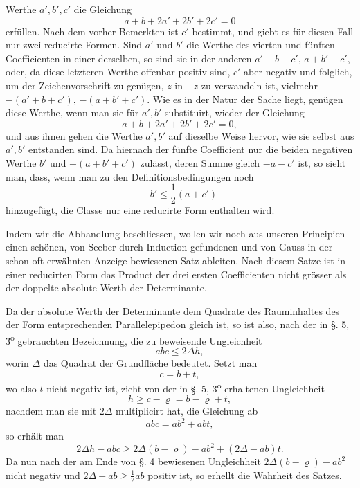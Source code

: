 \documentclass[11pt]{article}
\begin{document}
Werthe $a',b',c'$ die Gleichung
\[
 a+b+2a'+2b'+2c'=0
\]
erfüllen. Nach dem vorher Bemerkten ist $c'$ bestimmt, und giebt es für diesen Fall nur zwei reducirte Formen. Sind $a'$ und $b'$ die Werthe des vierten und fünften Coefficienten in einer derselben, so sind sie in der anderen $a'+b+c'$, $a+b'+c'$, oder, da diese letzteren Werthe offenbar positiv sind, $c'$ aber negativ und folglich, um der Zeichenvorschrift zu genügen, $z$ in $-z$ zu verwandeln ist, vielmehr $-(a'+b+c')$, $-(a+b'+c')$. Wie es in der Natur der Sache liegt, genügen diese Werthe, wenn man sie für $a',b'$ substituirt, wieder der Gleichung
\[
 a+b+2a'+2b'+2c'=0,
\]
und aus ihnen gehen die Werthe $a',b'$ auf dieselbe Weise hervor, wie sie selbst aus $a',b'$ entstanden sind. Da hiernach der fünfte Coefficient nur die beiden negativen Werthe $b'$ und $-(a+b'+c')$ zulässt, deren Summe gleich $-a-c'$ ist, so sieht man, dass, wenn man zu den Definitionsbedingungen noch
\[
 -b'\le \frac12(a+c')
\]
hinzugefügt, die Classe nur eine reducirte Form enthalten wird.

Indem wir die Abhandlung beschliessen, wollen wir noch aus unseren Principien einen schönen, von Seeber durch Induction gefundenen und von Gauss in der schon oft erwähnten Anzeige bewiesenen Satz ableiten. Nach diesem Satze ist in einer reducirten Form das Product der drei ersten Coefficienten nicht grösser als der doppelte absolute Werth der Determinante.

Da der absolute Werth der Determinante dem Quadrate des Rauminhaltes des der Form entsprechenden Parallelepipedon gleich ist, so ist also, nach der in §. 5, 3\textsuperscript{o} gebrauchten Bezeichnung, die zu beweisende Ungleichheit
\[
 abc\le 2\Delta h,
\]
worin $\Delta$ das Quadrat der Grundfläche bedeutet. Setzt man
\[
 c=b+t,
\]
wo also $t$ nicht negativ ist, zieht von der in §. 5, 3\textsuperscript{o} erhaltenen Ungleichheit
\[
 h\ge c-\varrho=b-\varrho+t,
\]
nachdem man sie mit $2\Delta$ multiplicirt hat, die Gleichung ab
\[
 abc=ab^2+abt,
\]
so erhält man
\[
 2\Delta h-abc\ge 2\Delta(b-\varrho)-ab^2+(2\Delta-ab)t.
\]
Da nun nach der am Ende von §. 4 bewiesenen Ungleichheit $2\Delta(b-\varrho)-ab^2$ nicht negativ und $2\Delta-ab\ge \frac12 ab$ positiv ist, so erhellt die Wahrheit des Satzes.
\end{document}
